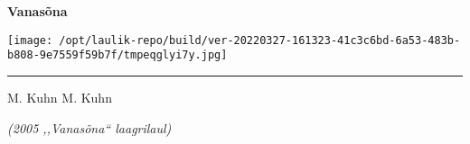 \documentclass[10pt]{book}
\begin{document}
{
  \samepage
  \raggedbottom
  \raggedright
  \sloppy


  \vspace{0.2in}
    \noindent\begin{minipage}{.1\textwidth}
      \hfill\vspace{0.1in}
    \end{minipage}%
    \noindent\begin{minipage}{.8\textwidth}
      \centering
      \bfseries
      \large Vanasõna
    \end{minipage}%
    \noindent\begin{minipage}{.1\textwidth}
      \texttt{[image: /opt/laulik-repo/build/ver-20220327-161323-41c3c6bd-6a53-483b-b808-9e7559f59b7f/tmpeqglyi7y.jpg]}
    \end{minipage}
  \nopagebreak[4]
  \vspace{0.1in}
  \nopagebreak[4]
  \hrule height 0.05ex
  \nopagebreak[4]
  \vspace{-0.05in}

  {\footnotesize M. Kuhn \hfill M. Kuhn }\\
  \vspace{0.01in}

  {\em {\footnotesize (2005 ,,Vanas\~ona{``} laagrilaul) } }
  \vspace{0.01in}

    \vspace{-0.05in}
  \nopagebreak[4]
  {%
\parindent 0pt
\noindent
\ifx\preLilyPondExample \undefined
\else
  \expandafter\preLilyPondExample
\fi
\def\lilypondbook{}%

\ifx\postLilyPondExample \undefined
\else
  \expandafter\postLilyPondExample
\fi
}
  \vspace{-0.1in}

}
\end{document}
